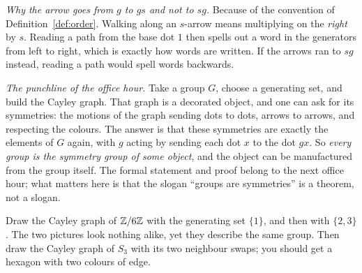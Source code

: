 \begin{why}
\emph{Why the arrow goes from $g$ to $gs$ and not to $sg$.} Because of the convention of
Definition~\ref{def:order}. Walking along an $s$-arrow means multiplying on the \emph{right} by $s$.
Reading a path from the base dot $1$ then spells out a word in the generators from left to right,
which is exactly how words are written. If the arrows ran to $sg$ instead, reading a path would
spell words backwards.
\end{why}


\begin{bigpic}
\emph{The punchline of the office hour.} Take a group $G$, choose a generating set, and build the
Cayley graph. That graph is a decorated object, and one can ask for its symmetries: the motions of
the graph sending dots to dots, arrows to arrows, and respecting the colours. The answer is that
these symmetries are exactly the elements of $G$ again, with $g$ acting by sending each dot $x$ to
the dot $gx$. So \emph{every group is the symmetry group of some object}, and the object can be
manufactured from the group itself. The formal statement and proof belong to the next office hour;
what matters here is that the slogan ``groups are symmetries'' is a theorem, not a slogan.
\end{bigpic}

\begin{tryit}
Draw the Cayley graph of $\mathbb{Z}/6\mathbb{Z}$ with the generating set $\{1\}$, and then with $\{2,3\}$. The two
pictures look nothing alike, yet they describe the same group. Then draw the Cayley graph of $S_3$
with its two neighbour swaps; you should get a hexagon with two colours of edge.
\end{tryit}
